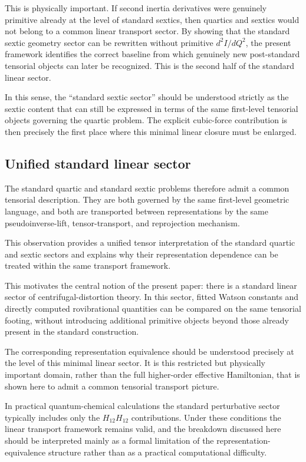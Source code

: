 \documentclass[aip,jcp,reprint,floatfix]{revtex4-2}
\begin{document}
This is physically important. If second inertia derivatives were
genuinely primitive already at the level of standard sextics, then
quartics and sextics would not belong to a common linear transport
sector. By showing that the standard sextic geometry sector can be
rewritten without primitive $d^2I/dQ^2$, the present framework
identifies the correct baseline from which genuinely new
post-standard tensorial objects can later be recognized. This is the
second half of the standard linear sector.

In this sense, the ``standard sextic sector'' should be understood
strictly as the sextic content that can still be expressed in terms of
the same first-level tensorial objects governing the quartic problem.
The explicit cubic-force contribution is then precisely the first place
where this minimal linear closure must be enlarged.

\subsection{Unified standard linear sector}

The standard quartic and standard sextic problems therefore admit a
common tensorial description. They are both governed by the same
first-level geometric language, and both are transported between
representations by the same pseudoinverse-lift, tensor-transport, and
reprojection mechanism.

This observation provides a unified tensor interpretation of the
standard quartic and sextic sectors and explains why their
representation dependence can be treated within the same transport
framework.

This motivates the central notion of the present paper: there is a
standard linear sector of centrifugal-distortion theory. In this
sector, fitted Watson constants and
directly computed rovibrational quantities can be compared on the same
tensorial footing, without introducing additional primitive objects
beyond those already present in the standard construction.

The corresponding representation equivalence should be understood precisely at the
level of this minimal linear sector. It is this restricted but
physically important domain, rather than the full higher-order
effective Hamiltonian, that is shown here to admit a common tensorial
transport picture.

In practical quantum-chemical calculations the standard perturbative
sector typically includes only the $H_{12}H_{12}$ contributions. Under
these conditions the linear transport framework remains valid, and the
breakdown discussed here should be interpreted mainly as a formal
limitation of the representation-equivalence structure rather than as a
practical computational difficulty.
\end{document}

